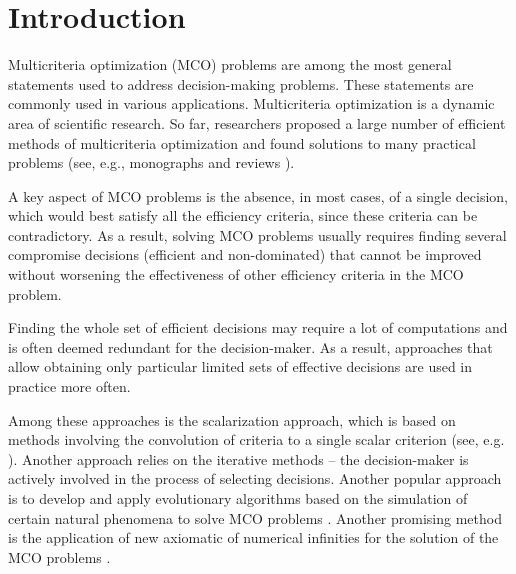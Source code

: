 \documentclass[smallextended]{svjour3}       %
\begin{document}
\section{Introduction}
\label{sec:1}

Multicriteria optimization (MCO) problems are among the most general statements used to address decision-making problems. These statements are commonly used in various applications. Multicriteria optimization is a dynamic area of scientific research. So far, researchers proposed a large number of efficient methods of multicriteria optimization and found solutions to many practical problems (see, e.g., monographs \cite{c1,c2,c3,c4,c5} and reviews \cite{c6,c7,c8,c9}).

A key aspect of MCO problems is the absence, in most cases, of a single decision, which would best satisfy all the efficiency criteria, since these criteria can be contradictory. As a result, solving MCO problems usually requires finding several compromise decisions (efficient and non-dominated) that cannot be improved without worsening the effectiveness of other efficiency criteria in the MCO problem.

Finding the whole set of efficient decisions may require a lot of computations and is often deemed redundant for the decision-maker. As a result, approaches that allow obtaining only particular limited sets of effective decisions are used in practice more often.

Among these approaches is the scalarization approach, which is based on methods involving the convolution of criteria to a single scalar criterion (see, e.g. \cite{c2,c14}). Another approach relies on the iterative methods \cite{c6,c10} -- the decision-maker is actively involved in the process of selecting decisions. Another popular approach is to develop and apply evolutionary algorithms based on the simulation of certain natural phenomena to solve MCO problems \cite{c10,c11,c12,c13}. Another promising method is the application of new axiomatic of numerical infinities for the solution of the MCO problems \cite{c57,c58,c59}.
\end{document}
